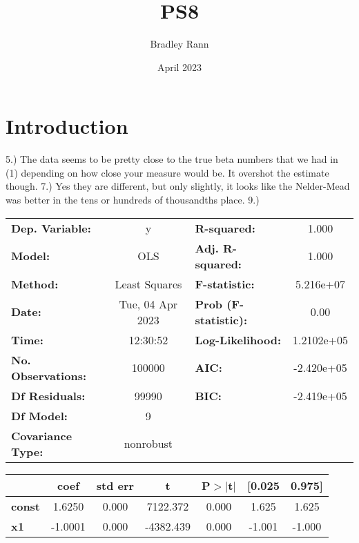 \documentclass{article}
\title{PS8}
\author{Bradley Rann }
\date{April 2023}
\begin{document}
\maketitle

\section{Introduction}

5.) The data seems to be pretty close to the true beta numbers that we had in (1) depending on how close your measure would be. It overshot the estimate though.
7.) Yes they are different, but only slightly, it looks like the Nelder-Mead was better in the tens or hundreds of thousandths place.
9.) \begin{center}
\begin{tabular}{lclc}
\toprule
\textbf{Dep. Variable:}    &        y         & \textbf{  R-squared:         } &     1.000   \\
\textbf{Model:}            &       OLS        & \textbf{  Adj. R-squared:    } &     1.000   \\
\textbf{Method:}           &  Least Squares   & \textbf{  F-statistic:       } & 5.216e+07   \\
\textbf{Date:}             & Tue, 04 Apr 2023 & \textbf{  Prob (F-statistic):} &     0.00    \\
\textbf{Time:}             &     12:30:52     & \textbf{  Log-Likelihood:    } & 1.2102e+05  \\
\textbf{No. Observations:} &      100000      & \textbf{  AIC:               } & -2.420e+05  \\
\textbf{Df Residuals:}     &       99990      & \textbf{  BIC:               } & -2.419e+05  \\
\textbf{Df Model:}         &           9      & \textbf{                     } &             \\
\textbf{Covariance Type:}  &    nonrobust     & \textbf{                     } &             \\
\bottomrule
\end{tabular}
\begin{tabular}{lcccccc}
               & \textbf{coef} & \textbf{std err} & \textbf{t} & \textbf{P$> |$t$|$} & \textbf{[0.025} & \textbf{0.975]}  \\
\midrule
\textbf{const} &       1.6250  &        0.000     &  7122.372  &         0.000        &        1.625    &        1.625     \\
\textbf{x1}    &      -1.0001  &        0.000     & -4382.439  &         0.000        &       -1.001    &       -1.000     \\

\end{tabular}
\end{center}
\end{document}
